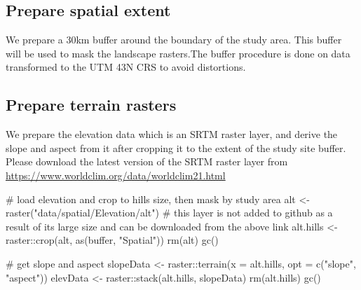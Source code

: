 \documentclass[
]{article}
\newenvironment{Shaded}{}{}
\newcommand{\CommentTok}[1]{\textcolor[rgb]{0.00,0.50,0.00}{#1}}
\newcommand{\DataTypeTok}[1]{#1}
\newcommand{\DecValTok}[1]{#1}
\newcommand{\FloatTok}[1]{#1}
\newcommand{\KeywordTok}[1]{\textcolor[rgb]{0.00,0.00,1.00}{#1}}
\newcommand{\NormalTok}[1]{#1}
\newcommand{\OperatorTok}[1]{#1}
\newcommand{\StringTok}[1]{\textcolor[rgb]{0.00,0.50,0.50}{#1}}
\begin{document}
\hypertarget{prepare-spatial-extent}{%
\subsection{Prepare spatial extent}\label{prepare-spatial-extent}}

We prepare a 30km buffer around the boundary of the study area. This buffer will be used to mask the landscape rasters.The buffer procedure is done on data transformed to the UTM 43N CRS to avoid distortions.

\begin{Shaded}
\end{Shaded}

\hypertarget{prepare-terrain-rasters}{%
\subsection{Prepare terrain rasters}\label{prepare-terrain-rasters}}

We prepare the elevation data which is an SRTM raster layer, and derive the slope and aspect from it after cropping it to the extent of the study site buffer. Please download the latest version of the SRTM raster layer from \url{https://www.worldclim.org/data/worldclim21.html}

\begin{Shaded}
\begin{Highlighting}[]
\CommentTok{# load elevation and crop to hills size, then mask by study area}
\NormalTok{alt <-}\StringTok{ }\KeywordTok{raster}\NormalTok{(}\StringTok{"data/spatial/Elevation/alt"}\NormalTok{) }\CommentTok{# this layer is not added to github as a result of its large size and can be downloaded from the above link}
\NormalTok{alt.hills <-}\StringTok{ }\NormalTok{raster}\OperatorTok{::}\KeywordTok{crop}\NormalTok{(alt, }\KeywordTok{as}\NormalTok{(buffer, }\StringTok{"Spatial"}\NormalTok{))}
\KeywordTok{rm}\NormalTok{(alt)}
\KeywordTok{gc}\NormalTok{()}

\CommentTok{# get slope and aspect}
\NormalTok{slopeData <-}\StringTok{ }\NormalTok{raster}\OperatorTok{::}\KeywordTok{terrain}\NormalTok{(}\DataTypeTok{x =}\NormalTok{ alt.hills, }\DataTypeTok{opt =} \KeywordTok{c}\NormalTok{(}\StringTok{"slope"}\NormalTok{, }\StringTok{"aspect"}\NormalTok{))}
\NormalTok{elevData <-}\StringTok{ }\NormalTok{raster}\OperatorTok{::}\KeywordTok{stack}\NormalTok{(alt.hills, slopeData)}
\KeywordTok{rm}\NormalTok{(alt.hills)}
\KeywordTok{gc}\NormalTok{()}
\end{Highlighting}
\end{Shaded}
\end{document}
